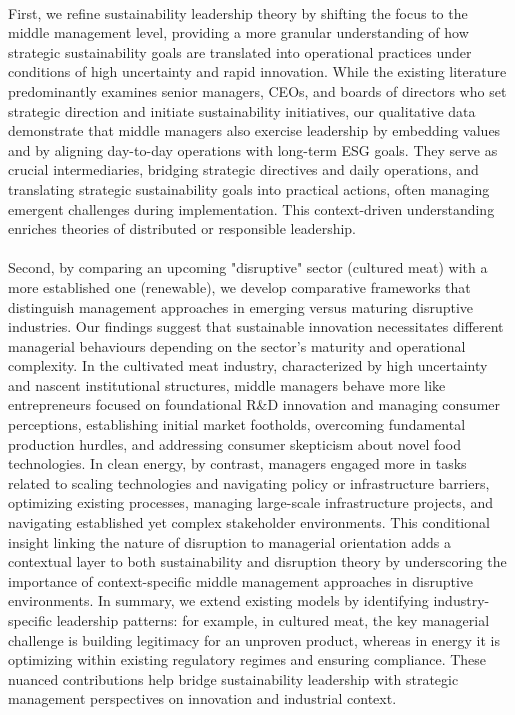 	\paragraph*{} First, we refine sustainability leadership theory by shifting the focus to the middle management level, providing a more granular understanding of how strategic sustainability goals are translated into operational practices under conditions of high uncertainty and rapid innovation. While the existing literature predominantly examines senior managers, CEOs, and boards of directors who set strategic direction and initiate sustainability initiatives, our qualitative data demonstrate that middle managers also exercise leadership by embedding values and by aligning day-to-day operations with long-term ESG goals. They serve as crucial intermediaries, bridging strategic directives and daily operations, and translating strategic sustainability goals into practical actions, often managing emergent challenges during implementation. This context-driven understanding enriches theories of distributed or responsible leadership.
	
	\paragraph*{} Second, by comparing an upcoming "disruptive" sector (cultured meat) with a more established one (renewable), we develop comparative frameworks that distinguish management approaches in emerging versus maturing disruptive industries. Our findings suggest that sustainable innovation necessitates different managerial behaviours depending on the sector's maturity and operational complexity. In the cultivated meat industry, characterized by high uncertainty and nascent institutional structures, middle managers behave more like entrepreneurs focused on foundational R\&D innovation and managing consumer perceptions, establishing initial market footholds, overcoming fundamental production hurdles, and addressing consumer skepticism about novel food technologies. In clean energy, by contrast, managers engaged more in tasks related to scaling technologies and navigating policy or infrastructure barriers, optimizing existing processes, managing large-scale infrastructure projects, and navigating established yet complex stakeholder environments. This conditional insight linking the nature of disruption to managerial orientation adds a contextual layer to both sustainability and disruption theory by underscoring the importance of context-specific middle management approaches in disruptive environments. In summary, we extend existing models by identifying industry-specific leadership patterns: for example, in cultured meat, the key managerial challenge is building legitimacy for an unproven product, whereas in energy it is optimizing within existing regulatory regimes and ensuring compliance. These nuanced contributions help bridge sustainability leadership with strategic management perspectives on innovation and industrial context.
	
